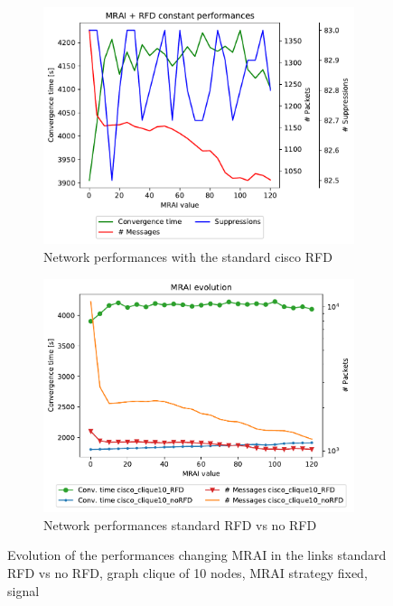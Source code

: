 \begin{figure}[h]
     \centering
     \begin{subfigure}[b]{0.45\textwidth}
         \centering
		 \includegraphics[width=\textwidth]{images/RFD/clique/cisco_clique10_RFD-constant_mrai_rfd_evolution.pdf}
		 \caption{Network performances with the standard cisco \ac{RFD} 
			}
		 \label{fig:clique_evolution_rfd}
     \end{subfigure}
     \hfill
     \begin{subfigure}[b]{0.45\textwidth}
         \centering
         \includegraphics[width=\textwidth]{images/RFD/clique/cisco_clique10_comparison_constant_all.pdf}
		 \caption{Network performances standard \ac{RFD} vs no \ac{RFD}}
         \label{fig:clique_evolution_rfd_vs_noRFd_comparison}
     \end{subfigure}
		\caption{Evolution of the performances changing \ac{MRAI} in the links
			standard \ac{RFD} vs no \ac{RFD},
			graph clique of \num{10} nodes, \ac{MRAI} strategy fixed, signal }
        \label{fig:clique_evolution_rfd_vs_noRFD}
\end{figure}

